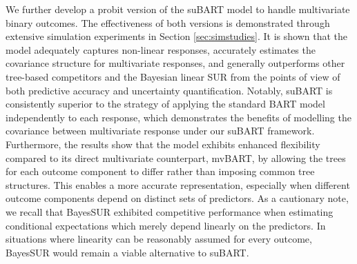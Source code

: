 \documentclass[aoas,preprint]{imsart}
\theoremstyle{plain}
\theoremstyle{definition}
\theoremstyle{remark}
\begin{document}
We further develop a probit version of the suBART model to handle multivariate binary outcomes. The effectiveness of both versions is demonstrated through extensive simulation experiments in Section \ref{sec:simstudies}. It is shown that the model adequately captures non-linear responses, accurately estimates the covariance structure for multivariate responses, and generally outperforms other tree-based competitors and the Bayesian linear SUR from the points of view of both predictive accuracy and uncertainty quantification. Notably, suBART is consistently superior to the strategy of applying the standard BART model independently to each response, which demonstrates the benefits of modelling the covariance between multivariate response under our suBART framework. Furthermore, the results show that the model exhibits enhanced flexibility compared to its direct multivariate counterpart, mvBART, by allowing the trees for each outcome component to differ rather than imposing common tree structures. This enables a more accurate representation, especially when different outcome components depend on distinct sets of predictors. As a cautionary note, we recall that BayesSUR exhibited competitive performance 
when estimating conditional expectations which merely depend linearly on the predictors.
In situations where linearity can be reasonably assumed for every outcome, BayesSUR would remain a viable alternative to suBART.
\end{document}
